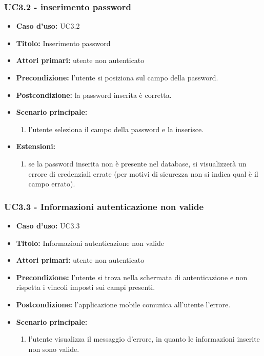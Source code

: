 \documentclass[casi-duso]{subfiles}
\begin{document}
\subsubsection{UC3.2 - inserimento password}
\label{subsub:uc3.2utente}
\begin{itemize}
  \item \textbf{Caso d’uso:} UC3.2 
  \item \textbf{Titolo:} Inserimento password
  \item \textbf{Attori primari:} utente non autenticato
  \item \textbf{Precondizione:} l'utente si posiziona sul campo della password.
  \item \textbf{Postcondizione:} la password inserita è corretta.
  \item \textbf{Scenario principale:} 
  \begin{enumerate}
    \item l'utente seleziona il campo della password e la inserisce.
  \end{enumerate}  
  \item \textbf{Estensioni:} 
  \begin{enumerate}
    \item se la password inserita non è presente nel database, si visualizzerà un errore di credenziali errate (per motivi di sicurezza
    non si indica qual è il campo errato).
  \end{enumerate}  
\end{itemize}

\subsubsection{UC3.3 - Informazioni autenticazione non valide}
\label{subsub:uc3.3utente}
\begin{itemize}
  \item \textbf{Caso d’uso:} UC3.3 
  \item \textbf{Titolo:} Informazioni autenticazione non valide
  \item \textbf{Attori primari:} utente non autenticato
  \item \textbf{Precondizione:} l'utente si trova nella schermata di autenticazione e non rispetta i vincoli imposti sui campi presenti.
  \item \textbf{Postcondizione:} l'applicazione mobile comunica all'utente l'errore.
  \item \textbf{Scenario principale:} 
  \begin{enumerate}
    \item l'utente visualizza il messaggio d'errore, in quanto le informazioni inserite non sono valide.
  \end{enumerate}  
\end{itemize}
\end{document}
